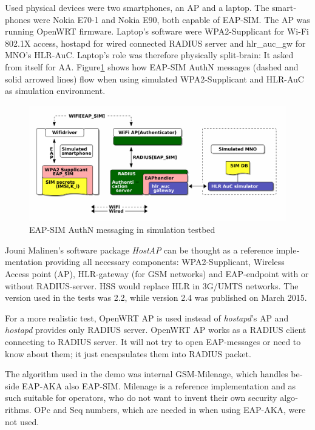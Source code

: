 \documentclass[12pt,a4paper,english]{tutthesis}
\begin{document}
\begin{otherlanguage}{english}
Used physical devices were two smartphones, an AP and a laptop.
The smartphones were Nokia E70-1 and Nokia E90, both capable of EAP-SIM.
The AP was running OpenWRT firmware.  
Laptop's software were WPA2-Supplicant for Wi-Fi 802.1X access,
hostapd for wired connected RADIUS server and hlr\_auc\_gw for MNO's
HLR-AuC. Laptop's role was therefore physically split-brain: It asked from itself for AA. 
Figure\ref{eap-sim-testbed} shows how EAP-SIM AuthN messages (dashed
and solid arrowed lines) flow when using 
simulated WPA2-Supplicant and HLR-AuC as simulation environment.

\begin{figure}[htb]
\centering
\includegraphics[width=.9\linewidth]{demoinfra.png}
\caption{\label{eap-sim-testbed}EAP-SIM AuthN messaging in simulation testbed}
\end{figure}




Jouni Malinen's software package \emph{HostAP}\cite{hostapd} can be thought
 as a reference
implementation providing all necessary components: WPA2-Supplicant, Wireless
Access point (AP), HLR-gateway (for GSM networks) and EAP-endpoint with
or without RADIUS-server. HSS would replace HLR in 3G/UMTS networks.
The version used in the tests was 2.2, while version
2.4 was published on March 2015.

For a more realistic test, OpenWRT AP is used instead of \emph{hostapd}'s
AP and \emph{hostapd} provides only RADIUS server.
OpenWRT AP works as a RADIUS client connecting to RADIUS server. 
It will not try to open EAP-messages or need
to know about them; it just encapsulates them into RADIUS packet.

The algorithm used in the demo was internal GSM-Milenage,
which handles beside EAP-AKA also EAP-SIM.
Milenage is a reference implementation and as such suitable for operators, who do not 
want to invent their own security algorithms. OPc and Seq numbers,
which are needed in when using EAP-AKA, were not used.


\end{otherlanguage}
\end{document}

